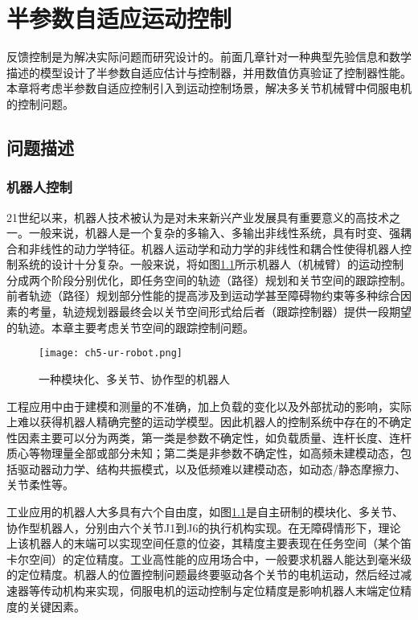 \chapter{半参数自适应运动控制}\label{chap:5}
反馈控制是为解决实际问题而研究设计的。前面几章针对一种典型先验信息和数学描述的模型设计了半参数自适应估计与控制器，并用数值仿真验证了控制器性能。本章将考虑半参数自适应控制引入到运动控制场景，解决多关节机械臂中伺服电机的控制问题。
\section{问题描述}\label{chap:5.1}
\subsection{机器人控制}\label{5.1.1}
21世纪以来，机器人技术被认为是对未来新兴产业发展具有重要意义的高技术之一。一般来说，机器人是一个复杂的多输入、多输出非线性系统，具有时变、强耦合和非线性的动力学特征。机器人运动学和动力学的非线性和耦合性使得机器人控制系统的设计十分复杂。一般来说，将如图\ref{fig.robot}所示机器人（机械臂）的运动控制分成两个阶段分别优化，即任务空间的轨迹（路径）规划和关节空间的跟踪控制。前者轨迹（路径）规划部分性能的提高涉及到运动学甚至障碍物约束等多种综合因素的考量，轨迹规划器最终会以关节空间形式给后者（跟踪控制器）提供一段期望的轨迹。本章主要考虑关节空间的跟踪控制问题。

\begin{figure}[!htb]
	\centering
	\texttt{[image: ch5-ur-robot.png]}\\	 %
	\caption{一种模块化、多关节、协作型的机器人}
	\label{fig.robot}
\end{figure}

工程应用中由于建模和测量的不准确，加上负载的变化以及外部扰动的影响，实际上难以获得机器人精确完整的运动学模型。因此机器人的控制系统中存在的不确定性因素主要可以分为两类，第一类是参数不确定性，如负载质量、连杆长度、连杆质心等物理量全部或部分未知；第二类是非参数不确定性，如高频未建模动态，包括驱动器动力学、结构共振模式，以及低频难以建模动态，如动态/静态摩擦力、关节柔性等。

工业应用的机器人大多具有六个自由度，如图\ref{fig.robot}是自主研制的模块化、多关节、协作型机器人，分别由六个关节J1到J6的执行机构实现。在无障碍情形下，理论上该机器人的末端可以实现空间任意的位姿，其精度主要表现在任务空间（某个笛卡尔空间）的定位精度。工业高性能的应用场合中，一般要求机器人能达到毫米级的定位精度。机器人的位置控制问题最终要驱动各个关节的电机运动，然后经过减速器等传动机构来实现，伺服电机的运动控制与定位精度是影响机器人末端定位精度的关键因素。


